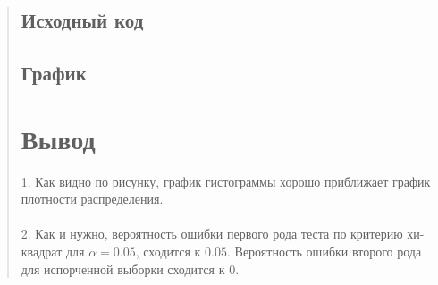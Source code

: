 \documentclass{article}
\begin{document}
\begin{quote}
\subsection{Исходный код}
	
\subsection{График}

\section{Вывод}
	1. Как видно по рисунку, график гистограммы хорошо приближает график плотности распределения. \\ \\
        2. Как и нужно, вероятность ошибки первого рода теста по критерию хи-квадрат для $\alpha = 0.05$, сходится к $0.05$. Вероятность ошибки второго рода для испорченной выборки сходится к $0$.
\end{quote}
\end{document}
